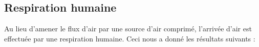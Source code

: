 \subsection{Respiration humaine}
Au lieu d'amener le flux d'air par une source d'air comprimé, l'arrivée d'air est effectuée par une respiration humaine. Ceci nous a donné les résultats suivants :


